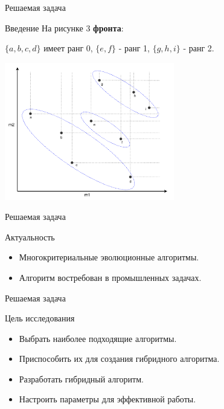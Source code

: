 \documentclass[table]{beamer}
\begin{document}
\begin{frame}{Решаемая задача}
\begin{block}{Введение}
На рисунке 3 \textbf{фронта}:

$\{a, b, c, d\}$ имеет ранг 0, $\{e, f\}$ - ранг 1, $\{g, h, i\}$ - ранг 2.
\begin{center}
\includegraphics*[height=6cm]{pic/non_dominated_sort.png}
\end{center}
\end{block}
\end{frame}

\begin{frame}{Решаемая задача}
\begin{block}{Актуальность}
\begin{itemize}
\item Многокритериальные эволюционные алгоритмы.
\item Алгоритм востребован в промышленных задачах.
\end{itemize}
\end{block}
\end{frame}


\begin{frame}{Решаемая задача}
\begin{block}{Цель исследования}
\begin{itemize}
\item Выбрать наиболее подходящие алгоритмы.
\item Приспособить их для создания гибридного алгоритма.
\item Разработать гибридный алгоритм.
\item Настроить параметры для эффективной работы.
\end{itemize}
\end{block}
\end{frame}
\end{document}
